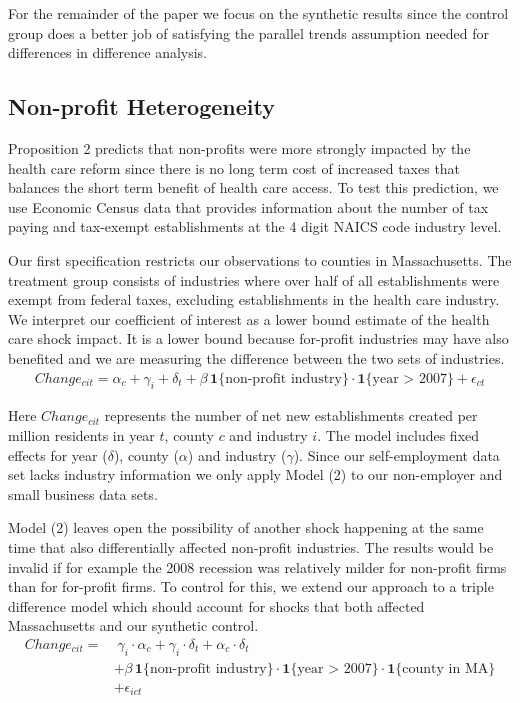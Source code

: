 \documentclass[12pt]{article}
\begin{document}
For the remainder of the paper we focus on the synthetic results since the control group does a better job of satisfying the parallel trends assumption needed for differences in difference analysis.

\subsection{Non-profit Heterogeneity}

Proposition 2 predicts that non-profits were more strongly impacted by the health care reform since there is no long term cost of increased taxes that balances the short term benefit of health care access. To test this prediction, we use Economic Census data that provides information about the number of tax paying and tax-exempt establishments at the 4 digit NAICS code industry level.  

Our first specification restricts our observations to counties in Massachusetts. The treatment group consists of industries where over half of all establishments were exempt from federal taxes, excluding establishments in the health care industry. We interpret our coefficient of interest as a lower bound estimate of the health care shock impact. It is a lower bound because for-profit industries may have also benefited and we are measuring the difference between the two sets of industries.
\begin{align}
Change_{cit} = \alpha_c + \gamma_i + \delta_t + \beta \, \mathbf{1}\{\text{non-profit industry}\} \cdot \mathbf{1}\{\text{year > 2007}\} + \epsilon_{ct}
\end{align}

Here $Change_{cit}$ represents the number of net new establishments created per million residents in year $t$, county $c$ and industry $i$. The model includes fixed effects for year ($\delta$), county ($\alpha$) and industry ($\gamma$). Since our self-employment data set lacks industry information we only apply Model (2) to our non-employer and small business data sets. 

Model (2) leaves open the possibility of another shock happening at the same time that also differentially affected non-profit industries. The results would be invalid if for example the 2008 recession was relatively milder for non-profit firms than for for-profit firms. To control for this, we extend our approach to a triple difference model which should account for shocks that both affected Massachusetts and our synthetic control. 
\begin{align}
Change_{cit} = & \; \gamma_i \cdot \alpha_c + \gamma_i \cdot \delta_t +  \alpha_c \cdot \delta_t \nonumber   \\
& + \beta \, \mathbf{1}\{\text{non-profit industry}\} \cdot \mathbf{1}\{\text{year > 2007}\}  \cdot \mathbf{1}\{\text{county in  MA}\} \nonumber  \\
& + \epsilon_{ict}
\end{align}
\end{document}
